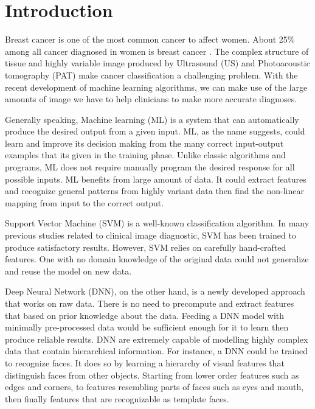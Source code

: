 \chapter{Introduction} %

Breast cancer is one of the most common cancer to affect women. About 25\% among all cancer diagnosed in women is breast cancer \citep{Siegel2015}. The complex structure of tissue and highly variable image produced by Ultrasound (US) and Photoacoustic tomography (PAT) make cancer classification a challenging problem. With the recent development of machine learning algorithms, we can make use of the large amounts of image we have to help clinicians to make more accurate diagnoses. 

Generally speaking, Machine learning (ML) is a system that can automatically produce the desired output from a given input. ML, as the name suggests, could learn and improve its decision making from the many correct input-output examples that its given in the training phase. Unlike classic algorithms and programs, ML does not require manually program the desired response for all possible inputs. ML benefits from large amount of data. It could extract features and recognize general patterns from highly variant data then find the non-linear mapping from input to the correct output. 

Support Vector Machine (SVM) is a well-known classification algorithm. In many previous studies related to clinical image diagnostic, SVM has been trained to produce satisfactory results\citep{Vassis2015}. However, SVM relies on carefully hand-crafted features. One with no domain knowledge of the original data could not generalize and reuse the model on new data.

Deep Neural Network (DNN)\citep{LeCun2015}, on the other hand, is a newly developed approach that works on raw data. There is no need to precompute and extract features that based on prior knowledge about the data. Feeding a DNN model with minimally pre-processed data would be sufficient enough for it to learn then produce reliable results. DNN are extremely capable of modelling highly complex data that contain hierarchical information. For instance, a DNN could be trained to recognize faces. It does so by learning a hierarchy of visual features that distinguish faces from other objects. Starting from lower order features such as edges and corners, to features resembling parts of faces such as eyes and mouth, then finally features that are recognizable as template faces.

